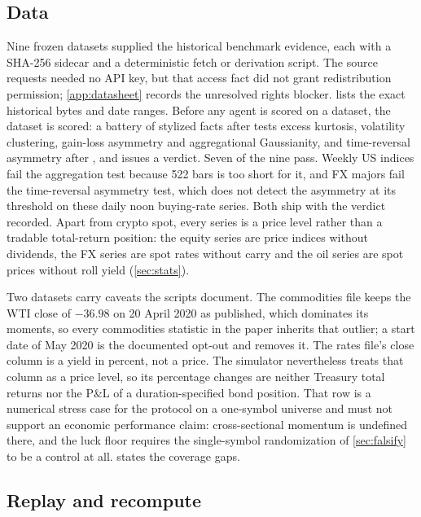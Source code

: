 \subsection{Data}\label{sec:data}

Nine frozen datasets supplied the historical benchmark evidence, each with a SHA-256 sidecar and a deterministic fetch or derivation script. The source requests needed no API key, but that access fact did not grant redistribution permission; \cref{app:datasheet} records the unresolved rights blocker.  lists the exact historical bytes and date ranges. Before any agent is scored on a dataset, the dataset is scored: a battery of stylized facts after \citet{cont2001empirical} tests excess kurtosis, volatility clustering, gain-loss asymmetry and aggregational Gaussianity, and time-reversal asymmetry after \citet{zumbach2009time}, and issues a verdict. Seven of the nine pass. Weekly US indices fail the aggregation test because 522 bars is too short for it, and FX majors fail the time-reversal asymmetry test, which does not detect the asymmetry at its threshold on these daily noon buying-rate series. Both ship with the verdict recorded. Apart from crypto spot, every series is a price level rather than a tradable total-return position: the equity series are price indices without dividends, the FX series are spot rates without carry and the oil series are spot prices without roll yield (\cref{sec:stats}).

Two datasets carry caveats the scripts document. The commodities file keeps the WTI close of $-36.98$ on 20 April 2020 as published, which dominates its moments, so every commodities statistic in the paper inherits that outlier; a start date of May 2020 is the documented opt-out and removes it. The rates file's close column is a yield in percent, not a price. The simulator nevertheless treats that column as a price level, so its percentage changes are neither Treasury total returns nor the P\&L of a duration-specified bond position. That row is a numerical stress case for the protocol on a one-symbol universe and must not support an economic performance claim: cross-sectional momentum is undefined there, and the luck floor requires the single-symbol randomization of \cref{sec:falsify} to be a control at all.  states the coverage gaps.

\subsection{Replay and recompute}\label{sec:replay}

